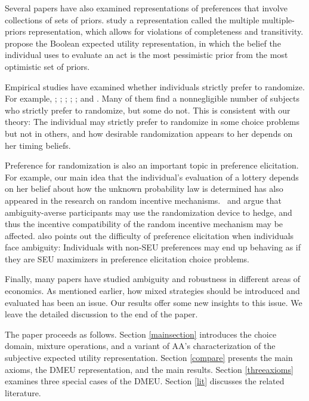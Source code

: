 \documentclass[12pt, notitlepage]{article}
\begin{document}
Several papers have also examined representations of preferences that
involve collections of sets of priors. \cite{LehrerTeper11} study a
representation called the multiple multiple-priors representation, which
allows for violations of completeness and transitivity. \cite%
{FrickIijimaLeYaouanq19} propose the Boolean expected utility
representation, in which the belief the individual uses to evaluate an act
is the most pessimistic prior from the most optimistic set of priors.

Empirical studies have examined whether individuals strictly prefer to
randomize. For example, \cite{DominiakSchnedler11}; \cite{AgranovOrtoleva17}%
; \cite{DwengerKublerWeizsacker16}; \cite{OechsslerRauRoomets19}; \cite%
{ChewMiaoShenEtAl19}; and \cite{ZhangZhong19}. Many of them find a
nonnegligible number of subjects who strictly prefer to randomize, but some
do not. This is consistent with our theory: The individual may strictly
prefer to randomize in some choice problems but not in others, and how
desirable randomization appears to her depends on her timing beliefs.

Preference for randomization is also an important topic in preference
elicitation. For example, our main idea that the individual's evaluation of
a lottery depends on her belief about how the unknown probability law is
determined has also appeared in the research on random incentive mechanisms. 
\cite{Bade15}\ and \cite{BaillonHalevyLi15} argue that ambiguity-averse
participants may use the randomization device to hedge, and thus the
incentive compatibility of the random incentive mechanism may be affected. 
\cite{Kuzmics17} also points out the difficulty of preference elicitation
when individuals face ambiguity: Individuals with non-SEU preferences may
end up behaving as if they are SEU maximizers in preference elicitation
choice problems.

Finally, many papers have studied ambiguity and robustness in different
areas of economics. As mentioned earlier, how mixed strategies should be
introduced and evaluated has been an issue. Our results offer some new
insights to this issue. We leave the detailed discussion to the end of the
paper.

The paper proceeds as follows. Section \ref{mainsection} introduces the
choice domain, mixture operations, and a variant of AA's characterization of
the subjective expected utility representation. Section \ref{compare}
presents the main axioms, the DMEU representation, and the main results.
Section \ref{threeaxioms} examines three special cases of the DMEU. Section %
\ref{lit} discusses the related literature.
\end{document}
